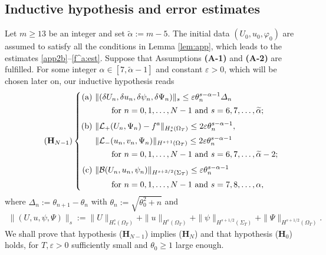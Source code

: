 \documentclass[twoside,11pt]{article}
\numberwithin{equation}{section}
\begin{document}
\subsection{Inductive hypothesis and error estimates}
Let $m\geq {13}$ be an integer and set $\widetilde{\alpha}:=m-{5}$.
The initial data $(U_0,u_0, \varphi_0)$ are assumed to satisfy all the conditions in Lemma \ref{lem:app},
which leads to the estimates \eqref{app2b}--\eqref{f^a:est}.
Suppose that Assumptions {\bf (A-1)} and {\bf (A-2)} are fulfilled.
For some integer $ {\alpha }\in [7,\widetilde{\alpha}-1]$
and constant $\varepsilon>0$,  which will be chosen later on,
our inductive hypothesis reads
\begin{align*}\tag{\textrm{$\mathbf{H}_{{N}-1}$}}
	\left\{\begin{aligned}
		\textrm{(a)} \ &
		\|(\delta U_{n}, \delta u_{n}, \delta \psi_{n},\delta \Psi_{n})\|_{s}
		\leq \varepsilon \theta_{n}^{s-{\alpha }-1}\varDelta_{n}
		\\[0.5mm]
		&\quad \quad \textrm{for } n=0,1,\ldots,{N}-1\textrm{ and }s=6,7,\ldots,\widetilde{\alpha} ;\\[1mm]
		\textrm{(b)} \  & \|\mathcal{L}_+( U_{n},  \Psi_{n})-f^a\|_{H_*^s(\Omega_{T})}\leq 2 \varepsilon \theta_{n}^{s-{\alpha }-1}, \\[0.5mm]
		&
		\|\mathcal{L}_-( u_{n},  v_n, \Psi_{n})\|_{H^{s+1}(\Omega_{T})}  \leq 2 \varepsilon \theta_{n}^{s-{\alpha }-1}\\[0.5mm]
		& \quad \quad  \textrm{for } n=0,1,\ldots,{N}-1\textrm{ and } s= 6,7,\ldots,\widetilde{\alpha}-2;\\[1mm]
		\textrm{(c)} \  &\|\mathcal{B}( U_{n}, u_{n}, \psi_{n})\|_{H^{s+3/2}(\Sigma_{T})} \leq  \varepsilon \theta_{n}^{s-{\alpha }-1}
		\\[0.5mm]
		& \quad \quad  \textrm{for } n=0,1,\ldots,{N}-1\textrm{ and } s=7,8,\ldots,{\alpha },
	\end{aligned}\right.
\end{align*}
where  $\varDelta_{n}:=\theta_{n+1}-\theta_{n}$ with
$\theta_{{n}}:=\sqrt{\theta^2_0+{n}}$ and
\begin{align} \label{norm:ring1}
	\|(U, u, \psi,\Psi)\|_{s}:=
	\|U\|_{H_*^{s}(\Omega_{T})}+ \|u\|_{H^{s}(\Omega_{T})}+	 \|\psi\|_{H^{s+1/2}(\Sigma_T)}
	+\| \Psi \|_{H^{s+1/2}(\Omega_{T})}.
\end{align}
We shall prove that
hypothesis ($\mathbf{H}_{{N}-1}$) implies ($\mathbf{H}_{{N}}$)
and that hypothesis ($\mathbf{H}_0$) holds,
for $T,\varepsilon>0$ sufficiently small and $\theta_0\geq 1$ large enough.
\end{document}
